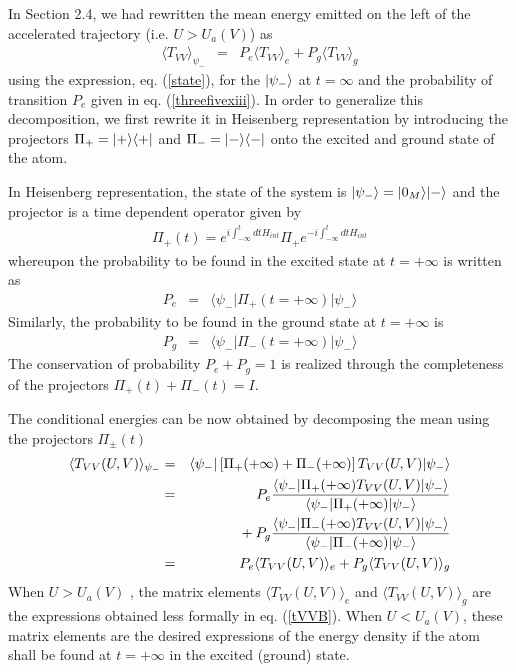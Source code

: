\documentclass[12pt]{article}
\begin{document}
In Section 2.4, we had rewritten the mean energy
emitted on the left of the accelerated trajectory (i.e. $U>U_a(V)$)
as
\begin{eqnarray} \langle T_{VV}
\rangle_{\psi_-} &=&
P_e \langle T_{VV}
\rangle_e + P_g \langle T_{VV} \rangle_g
\label{ooo}
\end{eqnarray}
using the expression, eq. (\ref{state}),
 for the $\mbox{$ \vert \psi_- \rangle $}$ at $t=\infty$ and the probability of
transition $P_e$ given in eq. (\ref{threefivexiii}).
In order to generalize this
decomposition, we first rewrite it in Heisenberg
representation by introducing the projectors $\Pi_+ =
\mbox{$ \vert + \rangle $}\mbox{$ \langle + \vert $}$ and  $\Pi_- = \mbox{$ \vert - \rangle $}\mbox{$ \langle - \vert $}$ onto the
excited and ground state of the atom.

In Heisenberg representation, the state of the system is
$\mbox{$ \vert \psi_- \rangle $}=\mbox{$ \vert 0_M \rangle $} \mbox{$ \vert - \rangle $}$ and the projector is a time dependent operator
given by
\begin{eqnarray}
\Pi_+(t) = e^{i\int^t_{-\infty} dt H_{int}} \Pi_+ e^{-i\int^t_{-\infty} dt
H_{int}}
\label{Pidet}
\end{eqnarray}
whereupon the probability to be found in the
excited
state at $t=+\infty$ is written as
\begin{eqnarray}
P_e
&=&\langle \psi_- \vert
\Pi_+(t=+\infty)   \vert \psi_-\rangle \label{ootwo}
\end{eqnarray}
Similarly, the probability to
be found in the ground state at $t=+ \infty$ is
\begin{eqnarray} P_g &=& \langle
\psi_- \vert  \Pi_-(t=+\infty)   \vert \psi_-\rangle
\label{oothree} \end{eqnarray} The conservation of
probability $P_e+P_g=1$ is realized through the
completeness of the projectors $\Pi_+(t)+ \Pi_-(t) = I$.

The conditional energies can be now obtained by decomposing
the mean using the projectors $\Pi_\pm(t)$
\begin{eqnarray}
\langle T_{VV}(U,V) \rangle_{\psi_-}
 &=& \langle \psi_- \vert \left[ \Pi_+ (+\infty) + \Pi_- (+\infty)\right]
T_{VV}(U,V)
\vert \psi_-\rangle\nonumber\\ &=& P_e { \langle \psi_-
\vert \Pi_+ (+\infty) T_{VV}(U,V) \vert \psi_-\rangle \over \langle
\psi_- \vert \Pi_+ (+\infty) \vert \psi_-\rangle }\nonumber\\
&& \quad {} + 
P_g { \langle \psi_- \vert \Pi_- (+\infty) T_{VV}(U,V) \vert
\psi_-\rangle \over \langle \psi_- \vert \Pi_- (+\infty) \vert
\psi_-\rangle }\nonumber\\ &=&  P_e \langle
T_{VV}(U,V)\rangle_e + P_g \langle  T_{VV}(U,V)\rangle_g
\label{oofour}
\end{eqnarray}
When $U>U_a(V)$ , the matrix
elements  $\langle  T_{VV}(U,V)\rangle_e$ and $\langle
T_{VV}(U,V)\rangle_g$ are the expressions obtained less
formally in eq. (\ref{tVVB}).
When
$U<U_a(V)$, these matrix elements are the desired
expressions of the energy density if the atom shall be
found at $t=+\infty$ in the excited (ground) state.
\end{document}
